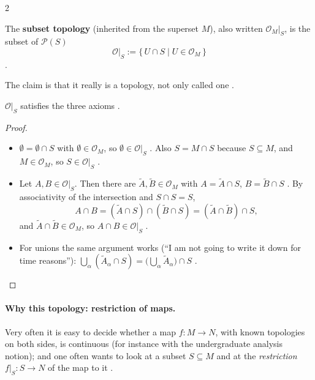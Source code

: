 \begin{paracol}{2}
\begin{definition}\label{def:c01-subset}
The \textbf{subset topology} (inherited from the superset $M$), also written $\mathcal O_M|_S$, is the subset of $\mathcal P(S)$
\[
  \mathcal O|_S:=\{\,U\cap S\mid U\in\mathcal O_M\,\}
\]
.
\end{definition}
The claim is that it really is a topology, not only called one .
\begin{proposition}\label{prop:c01-subset-ok}
$\mathcal O|_S$ satisfies the three axioms .
\end{proposition}
\begin{proof}
\begin{itemize}
  \item $\emptyset=\emptyset\cap S$ with $\emptyset\in\mathcal O_M$, so $\emptyset\in\mathcal O|_S$ . Also $S=M\cap S$ because $S\subseteq M$, and $M\in\mathcal O_M$,
        so $S\in\mathcal O|_S$ .
  \item Let $A,B\in\mathcal O|_S$. Then there are $\tilde A,\tilde B\in\mathcal O_M$ with $A=\tilde A\cap S$, $B=\tilde B\cap S$ . By associativity of the intersection and $S\cap S=S$,
        \[
           A\cap B=(\tilde A\cap S)\cap(\tilde B\cap S)=(\tilde A\cap\tilde B)\cap S,
        \]
        and $\tilde A\cap\tilde B\in\mathcal O_M$, so $A\cap B\in\mathcal O|_S$ .
  \item For unions the same argument works (``I am not going to write it down for time reasons''): $\bigcup_\alpha(\tilde A_\alpha\cap S)=\bigl(\bigcup_\alpha\tilde A_\alpha\bigr)\cap S$
        .
\end{itemize}
\end{proof}

\paragraph{Why this topology: restriction of maps.} Very often it is easy to decide whether a map $f\colon M\to N$, with known topologies on both sides, is continuous (for instance
with the undergraduate analysis notion); and one often wants to look at a subset $S\subseteq M$ and at the \emph{restriction} $f|_S\colon S\to N$ of the map to it
.


\end{paracol}
